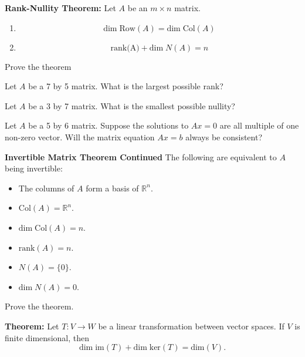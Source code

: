 \begin{enumerate}
{\bf Rank-Nullity Theorem:} Let $A$ be an $m\times n$ matrix.
\begin{enumerate}
\item $$\text{dim} \;\text{Row}(A)= \text{dim} \;\text{Col}(A)$$
\item $$\text{rank(A)}+\text{dim} \;N(A) =n$$
\end{enumerate}

\Problem Prove the theorem

\vfill

\vfill

\vfill

\Problem 

\Part Let $A$ be a 7 by 5 matrix. What is the largest possible rank?

\vfill

\Part Let $A$ be a 3 by 7 matrix. What is the smallest possible nullity?

\vfill

\Part Let $A$ be a 5 by 6 matrix. Suppose the solutions to $Ax=0$ are all multiple of one non-zero vector. Will the matrix equation $Ax=b$ always be consistent?

\vfill

\newpage

{\bf Invertible Matrix Theorem Continued} The following are equivalent to $A$ being invertible:
\begin{itemize}
\item[m.] The columns of $A$ form a basis of $\mathbb{R}^n$.
\item[n.] $\text{Col}(A)=\mathbb{R}^n$.
\item[o.] $\text{dim} \; \text{Col}(A)=n$.
\item[p.] $\text{rank}(A)=n$.
\item[q.] $N(A)=\{0\}$.
\item[r.] $\text{dim}\; N(A) =0$.
\end{itemize}

\Problem Prove the theorem.

\vfill

{\bf Theorem:} Let $T: V \to W$ be a linear transformation between vector spaces. If $V$ is finite dimensional, then $$\text{dim} \; \text{im}(T) + \text{dim} \; \text{ker}(T) =\text{dim}(V).$$

\end{enumerate}

